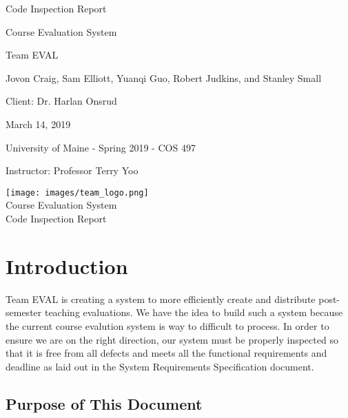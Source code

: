 \documentclass{article}
\begin{document}
\begin{titlepage}

\centering
\vspace*{2cm}
{\Huge Code Inspection Report\par}
\vspace{.25cm}
{\LARGE Course Evaluation System\par}
\vspace{1cm}
{\Large Team EVAL\par}
\vspace{.2cm}
{\Large Jovon Craig, Sam Elliott, Yuanqi Guo, Robert Judkins, and Stanley Small\par}
\vspace{1cm}
{\Large Client: Dr. Harlan Onsrud\par}
\vspace{1cm}
{\Large March 14, 2019\par}
\vspace{11cm}

University of Maine - Spring 2019 - COS 497

Instructor: Professor Terry Yoo

\end{titlepage}

\newpage

\begin{center}
{\texttt{[image: images/team\_logo.png]}} \\ 	\bigskip
{\LARGE Course Evaluation System } \\ \medskip
{\large Code Inspection Report } \\ \medskip
\end{center}

\tableofcontents

\newpage

\section{Introduction}

Team EVAL is creating a system to more efficiently create and distribute post-semester teaching evaluations. We have the idea to build such a system because the current course evalution system is way to difficult to process. In order to ensure we are on the right direction, our system must be properly inspected so that it is free from all defects and meets all the functional requirements and deadline as laid out in the System Requirements Specification document.
 
\subsection{Purpose of This Document}
\end{document}
